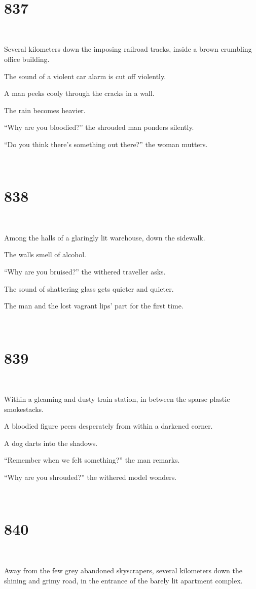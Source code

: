 \documentclass{report}
\begin{document}
~
\chapter*{837}
~

Several kilometers down the imposing railroad tracks, inside a brown crumbling office building.

The sound of a violent car alarm is cut off violently.

A man peeks cooly through the cracks in a wall.

The rain becomes heavier.

``Why are you bloodied?'' the shrouded man ponders silently.

``Do you think there's something out there?'' the woman mutters.

~
\chapter*{838}
~

Among the halls of a glaringly lit warehouse, down the sidewalk.

The walls smell of alcohol.

``Why are you bruised?'' the withered traveller asks.

The sound of shattering glass gets quieter and quieter.

The man and the lost vagrant lips' part for the first time.

~
\chapter*{839}
~

Within a gleaming and dusty train station, in between the sparse plastic smokestacks.

A bloodied figure peers desperately from within a darkened corner.

A dog darts into the shadows.

``Remember when we felt something?'' the man remarks.

``Why are you shrouded?'' the withered model wonders.

~
\chapter*{840}
~

Away from the few grey abandoned skyscrapers, several kilometers down the shining and grimy road, in the entrance of the barely lit apartment complex.
\end{document}
